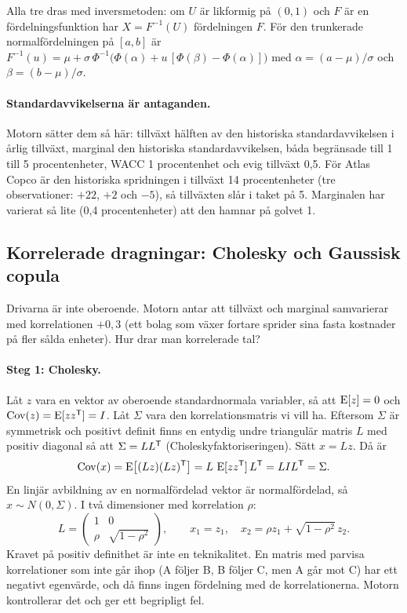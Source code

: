 Alla tre dras med inversmetoden: om $U$ är likformig på $(0, 1)$ och $F$ är en
fördelningsfunktion har $X = F^{-1}(U)$ fördelningen $F$. För den trunkerade
normalfördelningen på $[a, b]$ är
$F^{-1}(u) = \mu + \sigma\,\Phi^{-1}\bigl(\Phi(\alpha) + u\,[\Phi(\beta) - \Phi(\alpha)]\bigr)$
med $\alpha = (a-\mu)/\sigma$ och $\beta = (b-\mu)/\sigma$.

\paragraph{Standardavvikelserna är antaganden.} Motorn sätter dem så här: tillväxt hälften av
den historiska standardavvikelsen i årlig tillväxt, marginal den historiska standardavvikelsen,
båda begränsade till 1 till 5 procentenheter, WACC 1 procentenhet och evig tillväxt 0,5. För
Atlas Copco är den historiska spridningen i tillväxt 14 procentenheter (tre observationer:
$+22$, $+2$ och $-5$\pct), så tillväxten slår i taket på 5. Marginalen har varierat så lite
(0,4 procentenheter) att den hamnar på golvet 1.

\subsection{Korrelerade dragningar: Cholesky och Gaussisk copula}

Drivarna är inte oberoende. Motorn antar att tillväxt och marginal samvarierar med
korrelationen $+0,3$ (ett bolag som växer fortare sprider sina fasta kostnader på fler sålda
enheter). Hur drar man korrelerade tal?

\paragraph{Steg 1: Cholesky.} Låt $z$ vara en vektor av oberoende standardnormala variabler, så
att $\operatorname{E}[z] = 0$ och $\operatorname{Cov}(z) = \operatorname{E}[z z^{\mathsf{T}}] = I$. Låt $\Sigma$ vara den korrelationsmatris vi
vill ha. Eftersom $\Sigma$ är symmetrisk och positivt definit finns en entydig undre
triangulär matris $L$ med positiv diagonal så att $\Sigma = L L^{\mathsf{T}}$
(Choleskyfaktoriseringen). Sätt $x = L z$. Då är
\begin{equation}
  \operatorname{Cov}(x) = \operatorname{E}\bigl[(Lz)(Lz)^{\mathsf{T}}\bigr] = L\, \operatorname{E}[z z^{\mathsf{T}}]\, L^{\mathsf{T}} = L I L^{\mathsf{T}} = \Sigma .
  \label{eq:cholesky}
\end{equation}
En linjär avbildning av en normalfördelad vektor är normalfördelad, så $x \sim N(0, \Sigma)$.
I två dimensioner med korrelation $\rho$:
\begin{equation}
  L = \begin{pmatrix} 1 & 0 \\ \rho & \sqrt{1-\rho^2} \end{pmatrix},
  \qquad x_1 = z_1, \quad x_2 = \rho z_1 + \sqrt{1-\rho^2}\, z_2 .
  \label{eq:cholesky2}
\end{equation}
Kravet på positiv definithet är inte en teknikalitet. En matris med parvisa korrelationer som
inte går ihop (A följer B, B följer C, men A går mot C) har ett negativt egenvärde, och då
finns ingen fördelning med de korrelationerna. Motorn kontrollerar det och ger ett begripligt
fel.


